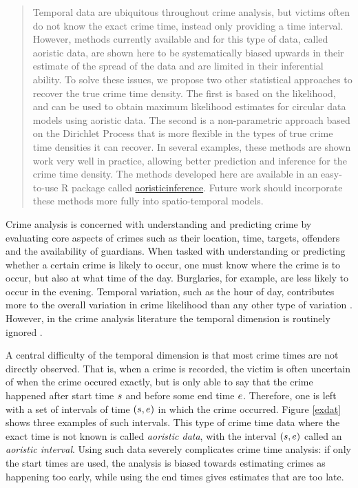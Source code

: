 \begin{abstract}
Temporal data are ubiquitous throughout crime analysis, but victims often do not know the exact crime time, instead only providing a time interval. However, methods currently available and for this type of data, called aoristic data, are shown here to be systematically biased upwards in their estimate of the spread of the data and are limited in their inferential ability. To solve these issues, we propose two other statistical approaches to recover the true crime time density. The first is based on the likelihood, and can be used to obtain maximum likelihood estimates for circular data models using aoristic data. The second is a non-parametric approach based on the Dirichlet Process that is more flexible in the types of true crime time densities it can recover. In several examples, these methods are shown work very well in practice, allowing better prediction and inference for the crime time density. The methods developed here are available in an easy-to-use R package called \href{https://github.com/keesmulder/aoristicinference}{aoristicinference}. Future work should incorporate these methods more fully into spatio-temporal models.
\end{abstract}
\newpage

Crime analysis is concerned with understanding and predicting crime by evaluating core aspects of crimes such as their location, time, targets, offenders and the availability of guardians. When tasked with understanding or predicting whether a certain crime is likely to occur, one must know where the crime is to occur, but also at what time of the day. Burglaries, for example, are less likely to occur in the evening. Temporal variation, such as the hour of day, contributes more to the overall variation in crime likelihood than any other type of variation \citep{felson2003simple}. However, in the crime analysis literature the temporal dimension is routinely ignored \citep{ratcliffe1998aoristic, ratcliffe2000aoristic}.

A central difficulty of the temporal dimension is that most crime times are not directly observed. That is, when a crime is recorded, the victim is often uncertain of when the crime occured exactly, but is only able to say that the crime happened after start time $s$ and before some end time $e$. Therefore, one is left with a set of intervals of time $(s, e)$ in which the crime occurred. Figure \ref{exdat} shows three examples of such intervals. This type of crime time data where the exact time is not known is called \textit{aoristic data}, with the interval $(s, e)$ called an  \textit{aoristic interval}. Using such data severely complicates crime time analysis: if only the start times are used, the analysis is biased towards estimating crimes as happening too early, while using the end times gives estimates that are too late.

